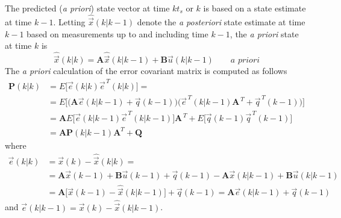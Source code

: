 \documentclass[12pt,a4paper,oneside]{book}
\begin{document}
\begin{onehalfspace}
The predicted (\textit{a priori}) state vector at time $kt_s$ or $k$ is based 
on a state estimate at time $k-1$. Letting $\hat{\vec{x}}\left(k|k-1\right)$ 
denote the \textit{a posteriori} state estimate at time $k-1$ based on 
measurements up to and including time $k-1$, the \textit{a priori} state at 
time $k$ is
\begin{equation}\label{kalman_1}
	\hat{\vec{x}}\left(k|k\right) = \mathbf{A} \hat{\vec{x}}\left(k|k-1\right) 
	+ \mathbf{B} \vec{u}\left(k|k-1\right) \qquad \textit{a priori}
\end{equation}
The \textit{a priori} calculation of the error covariant matrix is computed as 
follows
\begin{equation}\label{kalman_2}
	\begin{aligned}
		\mathbf{P}\left(k|k\right) &= E\Big[\vec{e}(k|k)\vec{e}^{\,T}(k|k)\Big] 
		= \\[6pt]
		&= E\Big[\Big(\mathbf{A}\vec{e}(k|k-1) + 
		\vec{q}(k-1)\Big)\Big(\vec{e}^{\,T}(k|k-1) \mathbf{A}^{\,T} + 
		\vec{q}^{\,T}(k-1)\Big)\Big] \\[6pt]
		&= \mathbf{A}E\Big[\vec{e}(k|k-1) 
		\vec{e}^{\,T}(k|k-1)\Big]\mathbf{A}^{\,T} + E\Big[\vec{q}(k-1) 
		\vec{q}^{\,T}(k-1)\Big] \\[6pt]
		&= \mathbf{A} \mathbf{P}\left(k|k-1\right) \mathbf{A}^T + \mathbf{Q}
	\end{aligned}
\end{equation}
where 
\begin{equation*}
	\begin{aligned}
		\vec{e}(k|k) &=\vec{x}(k) - \hat{\vec{x}}(k|k) = \\[6pt]
		&= \mathbf{A}\vec{x}(k-1)+\mathbf{B}\vec{u}(k-1)+\vec{q}(k-1) - 
		\mathbf{A}\vec{x}(k|k-1)+\mathbf{B}\vec{u}(k|k-1) \\[6pt]
		&= 
		\mathbf{A}\Big[\vec{x}(k-1)-\hat{\vec{x}}(k|k-1)\Big]+\vec{q}(k-1)=\mathbf{A}\vec{e}(k|k-1)+\vec{q}(k-1)
	\end{aligned}
\end{equation*}
and  $\vec{e}(k|k-1)=\vec{x}(k) - \hat{\vec{x}}(k|k-1)$. \\


\end{onehalfspace}
\end{document}
